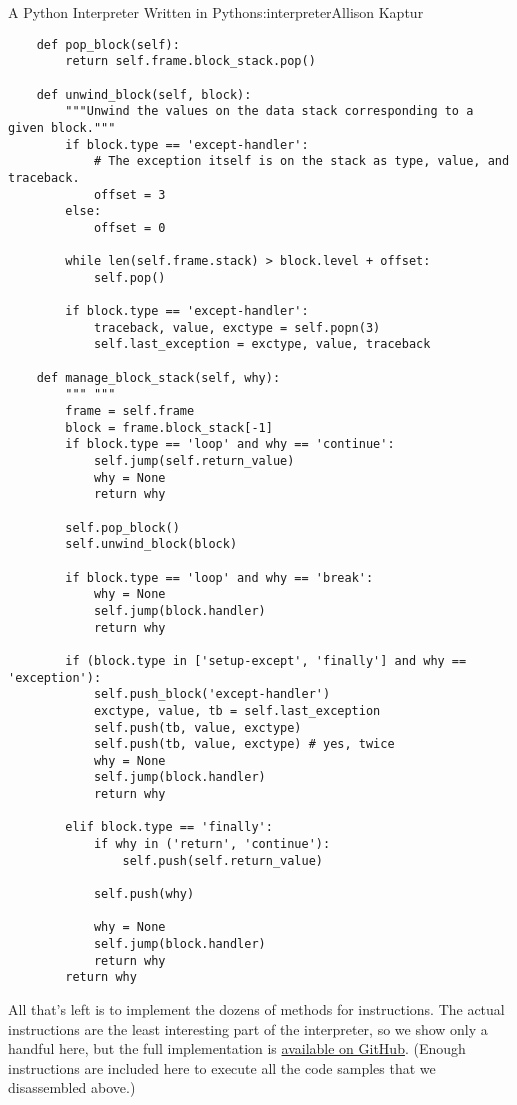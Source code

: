 \begin{aosachapter}{A Python Interpreter Written in Python}{s:interpreter}{Allison Kaptur}
\begin{verbatim}
    def pop_block(self):
        return self.frame.block_stack.pop()

    def unwind_block(self, block):
        """Unwind the values on the data stack corresponding to a given block."""
        if block.type == 'except-handler':
            # The exception itself is on the stack as type, value, and traceback.
            offset = 3  
        else:
            offset = 0

        while len(self.frame.stack) > block.level + offset:
            self.pop()

        if block.type == 'except-handler':
            traceback, value, exctype = self.popn(3)
            self.last_exception = exctype, value, traceback

    def manage_block_stack(self, why):
        """ """
        frame = self.frame
        block = frame.block_stack[-1]
        if block.type == 'loop' and why == 'continue':
            self.jump(self.return_value)
            why = None
            return why

        self.pop_block()
        self.unwind_block(block)

        if block.type == 'loop' and why == 'break':
            why = None
            self.jump(block.handler)
            return why

        if (block.type in ['setup-except', 'finally'] and why == 'exception'):
            self.push_block('except-handler')
            exctype, value, tb = self.last_exception
            self.push(tb, value, exctype)
            self.push(tb, value, exctype) # yes, twice
            why = None
            self.jump(block.handler)
            return why

        elif block.type == 'finally':
            if why in ('return', 'continue'):
                self.push(self.return_value)

            self.push(why)

            why = None
            self.jump(block.handler)
            return why
        return why
\end{verbatim}

\label{the-instructions}

All that's left is to implement the dozens of methods for instructions.
The actual instructions are the least interesting part of the
interpreter, so we show only a handful here, but the full implementation
is \href{https://github.com/nedbat/byterun}{available on GitHub}.
(Enough instructions are included here to execute all the code samples
that we disassembled above.)


\end{aosachapter}
